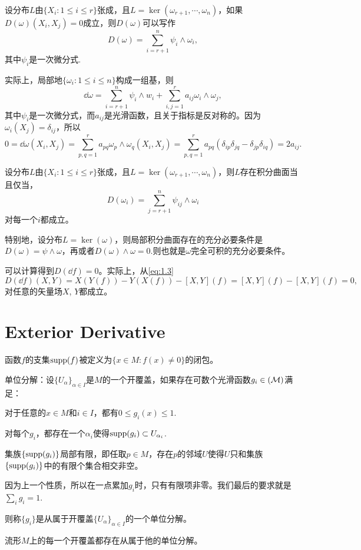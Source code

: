 \para 设分布$L$由$\{X_i:1\leq i \leq r\}$张成，且$L=\ker(\omega_{r+1},\cdots,\omega_n)$，如果$D(\omega)(X_i,X_j)=0$成立，则$D(\omega)$可以写作\[
	D(\omega)=\sum_{i=r+1}^n \psi_i\wedge \omega_i,
\]
其中$\psi_i$是一次微分式.

实际上，局部地$\{\omega_i:1\leq i\leq n\}$构成一组基，则
\[
	\dd \omega = \sum_{i=r+1}^n \psi_i\wedge w_i +\sum_{i,j=1}^r a_{ij}\omega_i\wedge \omega_j,
\]
其中$\psi_i$是一次微分式，而$a_{ij}$是光滑函数，且关于指标是反对称的。因为$\omega_i(X_j)=\delta_{ij}$，所以
\[
	0=\dd \omega(X_i,X_j)=\sum_{p,q=1}^r a_{pq}\omega_p\wedge \omega_q(X_i,X_j)=\sum_{p,q=1}^r a_{pq}(\delta_{ip}\delta_{jq}-\delta_{jp}\delta_{iq})=2a_{ij}.
\]

\para 设分布$L$由$\{X_i:1\leq i \leq r\}$张成，且$L=\ker(\omega_{r+1},\cdots,\omega_n)$，则$L$存在积分曲面当且仅当，
\[
	D(\omega_i)=\sum_{j=r+1}^n \psi_{ij}\wedge \omega_i
\]
对每一个$i$都成立。

\para 特别地，设分布$L=\ker(\omega)$，则局部积分曲面存在的充分必要条件是$D(\omega)=\psi\wedge \omega$，再或者$D(\omega)\wedge \omega=0$.则也就是$\omega$完全可积的充分必要条件。

\para \label{dd=0}可以计算得到$D(\dd f)=0$。实际上，从\eqref{eq:1.3}
\[
	D(\dd f)(X,Y)=X(Y(f))-Y(X(f))-[X,Y](f)=[X,Y](f)-[X,Y](f)=0,
\]
对任意的矢量场$X$, $Y$都成立。

\section{Exterior Derivative}

\para 函数$f$的支集$\operatorname{supp}(f)$被定义为$\{x\in M:f(x)\neq 0\}$的闭包。

\para 单位分解：设$\{U_\alpha\}_{\alpha\in I}$是$M$的一个开覆盖，如果存在可数个光滑函数$g_i\in \cal(M)$满足：

 对于任意的$x\in M$和$i\in I$，都有$0\leq g_i(x)\leq 1$.

 对每个$g_i$，都存在一个${\alpha_i}$使得$\operatorname{supp}(g_i)\subset U_{\alpha_i}$.

 集族$\{\operatorname{supp}(g_i)\}$局部有限，即任取$p\in M$，存在$p$的邻域$U$使得$U$只和集族$\{\operatorname{supp}(g_i)\}$中的有限个集合相交非空。

 因为上一个性质，所以在一点累加$g_i$时，只有有限项非零。我们最后的要求就是$\sum_i g_i=1$.

则称$\{g_i\}$是从属于开覆盖$\{U_\alpha\}_{\alpha\in I}$的一个单位分解。

\lem 流形$M$上的每一个开覆盖都存在从属于他的单位分解。

